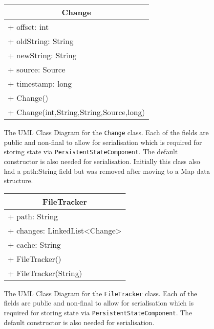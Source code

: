\begin{figure}[H]
\centering
\begin{tabular}{|l|}
\hline
\multicolumn{1}{|c|}{\textbf{Change}}\\ \hline
+ offset: int\\
+ oldString: String\\
+ newString: String\\
+ source: Source\\
+ timestamp: long\\ \hline
+ Change()\\
+ Change(int,String,String,Source,long)\\ \hline
\end{tabular}
\caption[Change UML Class Diagram]{The UML Class Diagram for the \texttt{Change} class. Each of the fields are public and non-final to allow for serialisation which is required for storing state via \texttt{PersistentStateComponent}. The default constructor is also needed for serialisation. Initially this class also had a path:String field but was removed after moving to a Map data structure.}
\label{fig:uml-class-change}
\end{figure}

\begin{figure}[H]
\centering
\begin{tabular}{|l|}
\hline
\multicolumn{1}{|c|}{\textbf{FileTracker}}\\ \hline
+ path: String\\
+ changes: LinkedList\textless{}Change\textgreater{}\\
+ cache: String\\ \hline
+ FileTracker()\\
+ FileTracker(String)\\ \hline
\end{tabular}
\caption[FileTracker UML Class Diagram]{The UML Class Diagram for the \texttt{FileTracker} class. Each of the fields are public and non-final to allow for serialisation which is required for storing state via \texttt{PersistentStateComponent}. The default constructor is also needed for serialisation.}
\label{fig:uml-class-filetracker}
\end{figure}

